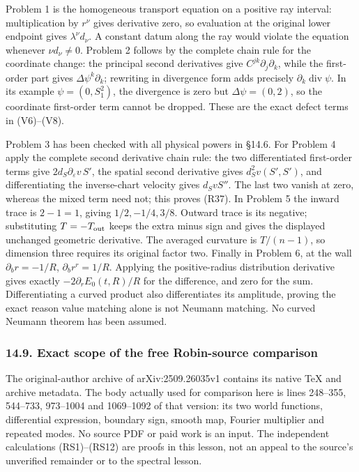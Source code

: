 \documentclass[
  11pt,
]{article}
\begin{document}
Problem 1 is the homogeneous transport equation on a positive ray
interval: multiplication by \(r^\nu\) gives derivative zero, so
evaluation at the original lower endpoint gives \(\lambda^\nu d_\nu\). A
constant datum along the ray would violate the equation whenever
\(\nu d_\nu\ne0\). Problem 2 follows by the complete chain rule for the
coordinate change: the principal second derivatives give
\(C^{jk}\partial_j\partial_k\), while the first-order part gives
\(\Delta\psi^k\partial_k\); rewriting in divergence form adds precisely
\(\partial_k\operatorname{div}\psi\). In its example \(\psi=(0,S_1^2)\),
the divergence is zero but \(\Delta\psi=(0,2)\), so the coordinate
first-order term cannot be dropped. These are the exact defect terms in
(V6)--(V8).

Problem 3 has been checked with all physical powers in §14.6. For
Problem 4 apply the complete second derivative chain rule: the two
differentiated first-order terms give
\(2d_S\partial_\varepsilon v\,S'\), the spatial second derivative gives
\(d_S^2v(S',S')\), and differentiating the inverse-chart velocity gives
\(d_SvS''\). The last two vanish at zero, whereas the mixed term need
not; this proves (R37). In Problem 5 the inward trace is \(2-1=1\),
giving \(1/2,-1/4,3/8\). Outward trace is its negative; substituting
\(T=-T_{\rm out}\) keeps the extra minus sign and gives the displayed
unchanged geometric derivative. The averaged curvature is \(T/(n-1)\),
so dimension three requires its original factor two. Finally in Problem
6, at the wall \(\partial_b r=-1/R\), \(\partial_b r^r=1/R\). Applying
the positive-radius distribution derivative gives exactly
\(-2\partial_rE_0(t,R)/R\) for the difference, and zero for the sum.
Differentiating a curved product also differentiates its amplitude,
proving the exact reason value matching alone is not Neumann matching.
No curved Neumann theorem has been assumed.

\subsubsection{14.9. Exact scope of the free Robin-source
comparison}\label{exact-scope-of-the-free-robin-source-comparison}

The original-author archive of arXiv:2509.26035v1 contains its native
TeX and archive metadata. The body actually used for comparison here is
lines 248--355, 544--733, 973--1004 and 1069--1092 of that version: its
two world functions, differential expression, boundary sign, smooth map,
Fourier multiplier and repeated modes. No source PDF or paid work is an
input. The independent calculations (RS1)--(RS12) are proofs in this
lesson, not an appeal to the source's unverified remainder or to the
spectral lesson.
\end{document}
